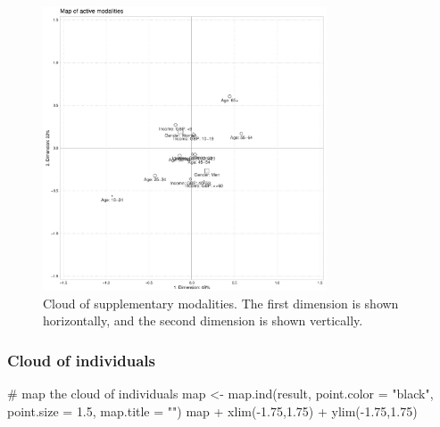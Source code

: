 \documentclass[
  letterpaper,
  DIV=11,
  numbers=noendperiod]{scrartcl}
\newenvironment{Shaded}{\begin{snugshade}}{\end{snugshade}}
\newcommand{\AttributeTok}[1]{\textcolor[rgb]{0.40,0.45,0.13}{#1}}
\newcommand{\CommentTok}[1]{\textcolor[rgb]{0.37,0.37,0.37}{#1}}
\newcommand{\FloatTok}[1]{\textcolor[rgb]{0.68,0.00,0.00}{#1}}
\newcommand{\FunctionTok}[1]{\textcolor[rgb]{0.28,0.35,0.67}{#1}}
\newcommand{\NormalTok}[1]{\textcolor[rgb]{0.00,0.23,0.31}{#1}}
\newcommand{\OtherTok}[1]{\textcolor[rgb]{0.00,0.23,0.31}{#1}}
\newcommand{\SpecialCharTok}[1]{\textcolor[rgb]{0.37,0.37,0.37}{#1}}
\newcommand{\StringTok}[1]{\textcolor[rgb]{0.13,0.47,0.30}{#1}}
\begin{document}
\begin{figure}[H]

{\centering \includegraphics[width=0.75\textwidth,height=\textheight]{ctrl+R_files/figure-pdf/unnamed-chunk-11-1.pdf}

}

\caption{Cloud of supplementary modalities. The first dimension is shown
horizontally, and the second dimension is shown vertically.}

\end{figure}%

\normalsize

\subsubsection{Cloud of individuals}\label{cloud-of-individuals}

\scriptsize

\begin{Shaded}
\begin{Highlighting}[]
\CommentTok{\# map the cloud of individuals}
\NormalTok{map }\OtherTok{\textless{}{-}} \FunctionTok{map.ind}\NormalTok{(result, }\AttributeTok{point.color =} \StringTok{"black"}\NormalTok{, }\AttributeTok{point.size =} \FloatTok{1.5}\NormalTok{, }\AttributeTok{map.title =} \StringTok{""}\NormalTok{)}
\NormalTok{map }\SpecialCharTok{+} \FunctionTok{xlim}\NormalTok{(}\SpecialCharTok{{-}}\FloatTok{1.75}\NormalTok{,}\FloatTok{1.75}\NormalTok{) }\SpecialCharTok{+} \FunctionTok{ylim}\NormalTok{(}\SpecialCharTok{{-}}\FloatTok{1.75}\NormalTok{,}\FloatTok{1.75}\NormalTok{)}
\end{Highlighting}
\end{Shaded}
\end{document}
